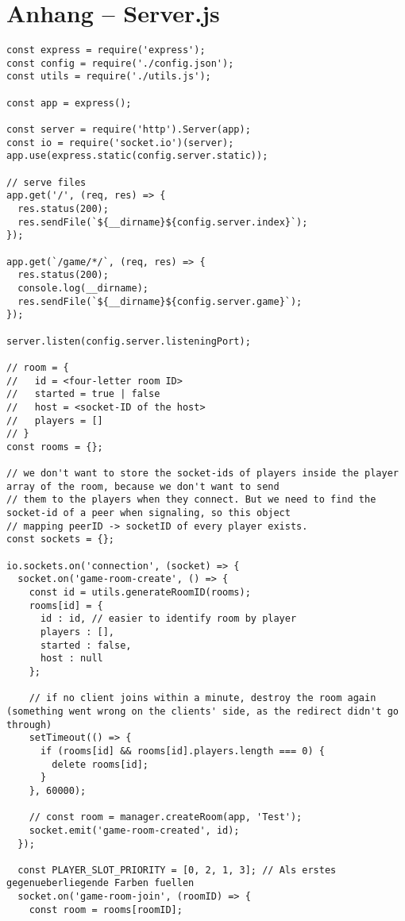 \chapter{Anhang -- Server.js}
\lstset{language=js, style=STYLE_CODE_JS}
\begin{singlespace}
\begin{lstlisting}[]
const express = require('express');
const config = require('./config.json');
const utils = require('./utils.js');

const app = express();

const server = require('http').Server(app);
const io = require('socket.io')(server);
app.use(express.static(config.server.static));

// serve files
app.get('/', (req, res) => {
  res.status(200);
  res.sendFile(`${__dirname}${config.server.index}`);
});

app.get(`/game/*/`, (req, res) => {
  res.status(200);
  console.log(__dirname);
  res.sendFile(`${__dirname}${config.server.game}`);
});

server.listen(config.server.listeningPort);

// room = {
//   id = <four-letter room ID>
//   started = true | false
//   host = <socket-ID of the host>
//   players = []
// }
const rooms = {};

// we don't want to store the socket-ids of players inside the player array of the room, because we don't want to send
// them to the players when they connect. But we need to find the socket-id of a peer when signaling, so this object
// mapping peerID -> socketID of every player exists.
const sockets = {};

io.sockets.on('connection', (socket) => {
  socket.on('game-room-create', () => {
    const id = utils.generateRoomID(rooms);
    rooms[id] = {
      id : id, // easier to identify room by player
      players : [],
      started : false,
      host : null
    };

    // if no client joins within a minute, destroy the room again (something went wrong on the clients' side, as the redirect didn't go through)
    setTimeout(() => {
      if (rooms[id] && rooms[id].players.length === 0) {
        delete rooms[id];
      }
    }, 60000);

    // const room = manager.createRoom(app, 'Test');
    socket.emit('game-room-created', id);
  });

  const PLAYER_SLOT_PRIORITY = [0, 2, 1, 3]; // Als erstes gegenueberliegende Farben fuellen
  socket.on('game-room-join', (roomID) => {
    const room = rooms[roomID];


\end{lstlisting}
\end{singlespace}
